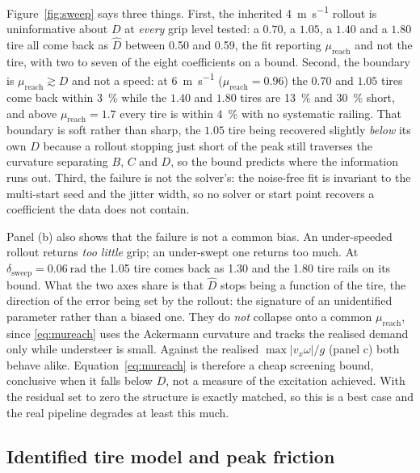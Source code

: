Figure~\ref{fig:sweep} says three things. First, the inherited
\SI{4}{\meter\per\second} rollout is uninformative about $D$ at \emph{every}
grip level tested: a $0.70$, a $1.05$, a $1.40$ and a $1.80$ tire all come
back as $\hat D$ between \num{0.50} and \num{0.59}, the fit reporting
$\mu_{\mathrm{reach}}$ and not the tire, with two to seven of the eight
coefficients on a bound. Second, the boundary is $\mu_{\mathrm{reach}}\gtrsim
D$ and not a speed: at \SI{6}{\meter\per\second} ($\mu_{\mathrm{reach}}=0.96$)
the $0.70$ and $1.05$ tires come back within \SI{3}{\percent} while the $1.40$
and $1.80$ tires are \SI{13}{\percent} and \SI{30}{\percent} short, and above
$\mu_{\mathrm{reach}}=1.7$ every tire is within \SI{4}{\percent} with no
systematic railing. That boundary is soft rather than sharp, the $1.05$ tire
being recovered slightly \emph{below} its own $D$ because a rollout stopping
just short of the peak still traverses the curvature separating $B$, $C$ and
$D$, so the bound predicts where the information runs out. Third, the
failure is not the solver's: the noise-free fit is invariant to the multi-start
seed and the jitter width, so no solver or start point recovers a coefficient
the data does not contain.

Panel (b) also shows that the failure is not a common bias. An under-speeded
rollout returns \emph{too little} grip; an under-swept one returns too much. At
$\delta_{\mathrm{sweep}}=\SI{0.06}{\radian}$ the \num{1.05} tire comes back as
\num{1.30} and the \num{1.80} tire rails on its bound. What the two axes share
is that $\hat D$ stops being a function of the tire, the direction of the error
being set by the rollout: the signature of an unidentified parameter rather
than a biased one. They do \emph{not} collapse onto a common
$\mu_{\mathrm{reach}}$, since \eqref{eq:mureach} uses the Ackermann curvature
and tracks the realised demand only while understeer is small. Against the
realised $\max|v_{x}\omega|/g$ (panel c) both behave alike.
Equation~\eqref{eq:mureach} is therefore a cheap screening bound, conclusive
when it falls below $D$, not a measure of the excitation achieved. With the
residual set to zero the structure is exactly matched, so this is a best case
and the real pipeline degrades at least this much.

\subsection{Identified tire model and peak friction}
\label{subsec:resultstire}

